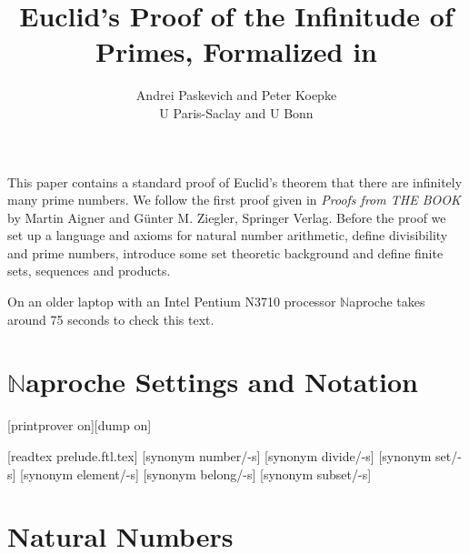 \documentclass[11pt]{article}
\author{Andrei Paskevich and Peter Koepke\\
   U Paris-Saclay and U Bonn}
\title{Euclid's Proof 
of the Infinitude of Primes, Formalized in \Naproche{}}
\begin{document}
\newcommand{\val}[2]{#1_{#2}}
\newcommand{\Prod}[3]{#1_{#2} \cdots #1_{#3}}
\newcommand{\Seq}[2]{\{#1,\dots,#2\}}
\newcommand{\Set}[3]{\{#1_{#2},\dots,#1_{#3}\}}
\newcommand{\Primes}{\mathbb{P}}
\newcommand{\Naproche}{$\mathbb{N}$aproche}

\maketitle

This paper contains a standard proof of Euclid's theorem 
that there are infinitely many prime numbers. We
follow the first proof given in \emph{Proofs from THE BOOK}
by Martin Aigner and Günter M. Ziegler, Springer Verlag.
Before the proof we 
set up a language and axioms for natural number arithmetic,
define divisibility and prime numbers,
introduce some set theoretic background and define
finite sets, sequences and products.

On an older laptop 
with an Intel Pentium N3710 processor \Naproche{} takes 
around 75 seconds to check this text.


\section{\Naproche{} Settings and Notation}

\begin{forthel}


[printprover on][dump on]

[readtex prelude.ftl.tex]
[synonym number/-s]
[synonym divide/-s]
[synonym set/-s] [synonym element/-s] 
[synonym belong/-s] [synonym subset/-s]

\end{forthel}


\section{Natural Numbers}
 
\end{document}
